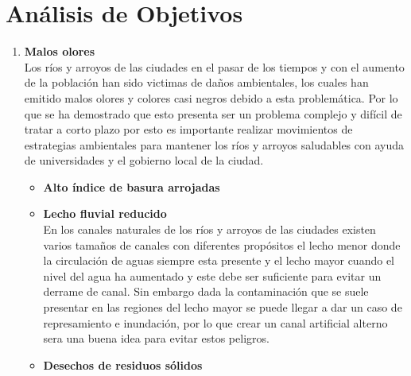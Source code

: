 \section{Análisis de Objetivos}


\begin{enumerate}
	\item \textbf{Malos olores}\\
	      Los ríos y arroyos de las ciudades en el pasar de los tiempos y con el aumento de la población han sido victimas de daños ambientales, los cuales han emitido malos olores y colores casi negros debido a esta problemática. Por lo que se ha demostrado que esto presenta ser un problema complejo y difícil de tratar a corto plazo por esto es importante realizar movimientos de estrategias ambientales para mantener los ríos y arroyos saludables con ayuda de universidades y el gobierno local de la ciudad.
	      \begin{itemize}
		      \item \textbf{Alto índice de basura arrojadas}\\

		      \item \textbf{Lecho fluvial reducido} \\
		            En los canales naturales de los ríos y arroyos de las ciudades existen varios tamaños de canales con diferentes propósitos el lecho menor donde la circulación de aguas siempre esta presente y el lecho mayor cuando el nivel del agua ha aumentado y este debe ser suficiente para evitar un derrame de canal. Sin embargo dada la contaminación que se suele presentar en las regiones del lecho mayor se puede llegar a dar un caso de represamiento e inundación, por lo que crear un canal artificial alterno sera una buena idea para evitar estos peligros.
		      \item \textbf{Desechos de residuos sólidos}\\


\end{itemize}
\end{enumerate}
